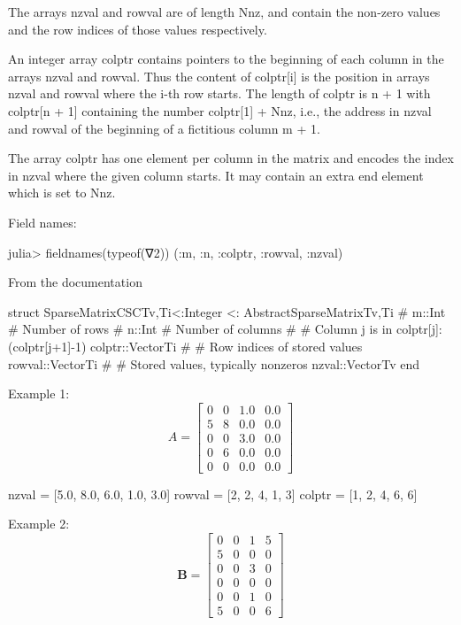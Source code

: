 The arrays nzval and rowval are of length Nnz, and contain the non-zero values
and the row indices of those values respectively.

An integer array colptr contains pointers to the beginning of each column in the
arrays nzval and rowval. Thus the content of colptr[i] is the position in
arrays nzval and rowval where the i-th row starts.
The length of colptr is n + 1 with colptr[n + 1] containing
the number colptr[1] + Nnz, i.e., the address in
nzval and rowval of the beginning of a
fictitious column m + 1.

The array colptr has one element per column in the matrix and encodes
the index in nzval where the given column starts. 
It may contain an extra end element which is set to Nnz.

Field names:
\begin{textcode}
julia> fieldnames(typeof(∇2))
(:m, :n, :colptr, :rowval, :nzval)  
\end{textcode}

From the documentation
\begin{juliacode}
struct SparseMatrixCSC{Tv,Ti<:Integer} <: AbstractSparseMatrix{Tv,Ti}
    #
    m::Int  # Number of rows
    #
    n::Int  # Number of columns
    #
    # Column j is in colptr[j]:(colptr[j+1]-1)
    colptr::Vector{Ti}
    #
    # Row indices of stored values
    rowval::Vector{Ti}
    # # Stored values, typically nonzeros
    nzval::Vector{Tv}
end
\end{juliacode}

Example 1:
\begin{equation}
A = \begin{bmatrix}
0  &  0  &  1.0 &  0.0 \\
5  &  8  &  0.0 &  0.0 \\
0  &  0  &  3.0 &  0.0 \\
0  &  6  &  0.0 &  0.0 \\
0  &  0  &  0.0 &  0.0
\end{bmatrix}
\end{equation}

\begin{textcode}
nzval = [5.0, 8.0, 6.0, 1.0, 3.0]
rowval = [2, 2, 4, 1, 3]
colptr = [1, 2, 4, 6, 6]
\end{textcode}

Example 2:
\begin{equation}
\mathbf{B} = \begin{bmatrix}
0  &  0  &  1  &  5 \\
5  &  0  &  0  &  0 \\
0  &  0  &  3  &  0 \\
0  &  0  &  0  &  0 \\
0  &  0  &  1  &  0 \\
5  &  0  &  0  &  6
\end{bmatrix}
\end{equation}

